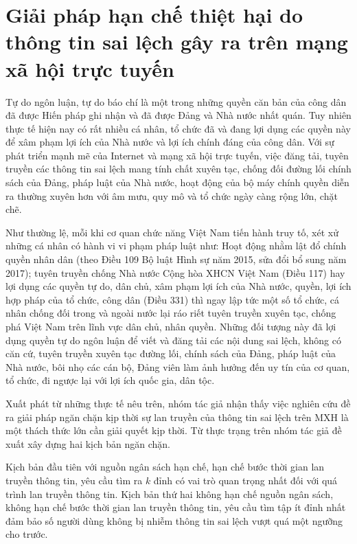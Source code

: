 \chapter{Giải pháp hạn chế thiệt hại do thông tin sai lệch gây ra trên mạng xã hội trực tuyến}

Tự do ngôn luận, tự do báo chí là một trong những quyền căn bản của công dân đã được Hiến pháp ghi nhận và đã được Đảng và Nhà nước nhất quán. Tuy nhiên thực tế hiện nay có rất nhiều cá nhân, tổ chức đã và đang lợi dụng các quyền này để xâm phạm lợi ích của Nhà nước và lợi ích chính đáng của công dân. Với sự phát triển mạnh mẽ của Internet và mạng xã hội trực tuyến, việc đăng tải, tuyên truyền các thông tin sai lệch mang tính chất xuyên tạc, chống đối đường lối chính sách của Đảng, pháp luật của Nhà nước, hoạt động của bộ máy chính quyền diễn ra thường xuyên hơn với âm mưu, quy mô và tổ chức ngày càng rộng lớn, chặt chẽ.

Như thường lệ, mỗi khi cơ quan chức năng Việt Nam tiến hành truy tố, xét xử những cá nhân có hành vi vi phạm pháp luật như: Hoạt động nhằm lật đổ chính quyền nhân dân (theo Điều 109 Bộ luật Hình sự năm 2015, sửa đổi bổ sung năm 2017); tuyên truyền chống Nhà nước Cộng hòa XHCN Việt Nam (Điều 117) hay lợi dụng các quyền tự do, dân chủ, xâm phạm lợi ích của Nhà nước, quyền, lợi ích hợp pháp của tổ chức, công dân (Điều 331) thì ngay lập tức một số tổ chức, cá nhân chống đối trong và ngoài nước lại ráo riết tuyên truyền xuyên tạc, chống phá Việt Nam trên lĩnh vực dân chủ, nhân quyền. Những đối tượng này đã lợi dụng quyền tự do ngôn luận để viết và đăng tải các nội dung sai lệch, không có căn cứ, tuyên truyền xuyên tạc đường lối, chính sách của Đảng, pháp luật của Nhà nước, bôi nhọ các cán bộ, Đảng viên làm ảnh hưởng đến uy tín của cơ quan, tổ chức, đi ngược lại với lợi ích quốc gia, dân tộc.

Xuất phát từ những thực tế nêu trên, nhóm tác giả nhận thấy việc nghiên cứu đề ra giải pháp ngăn chặn kịp thời sự lan truyền của thông tin sai lệch trên MXH là một thách thức lớn cần giải quyết kịp thời. Từ thực trạng trên nhóm tác giả đề xuất xây dựng hai kịch bản ngăn chặn.

Kịch bản đầu tiên với nguồn ngân sách hạn chế, hạn chế bước thời gian lan truyền thông tin, yêu cầu tìm ra $k$ đỉnh có vai trò quan trọng nhất đối với quá trình lan truyền thông tin. Kịch bản thứ hai không hạn chế nguồn ngân sách, không hạn chế bước thời gian lan truyền thông tin, yêu cầu tìm tập ít đỉnh nhất đảm bảo số người dùng không bị nhiễm thông tin sai lệch vượt quá một ngưỡng cho trước.

